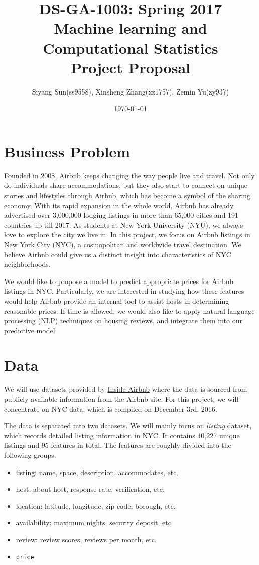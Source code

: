 \documentclass{article}
\begin{document}
	
	\pagestyle{fancy}
	\fancyhf{}
	
	\title{DS-GA-1003: Spring 2017 \\ 
		Machine learning and Computational Statistics \\ 
		Project Proposal}
	\date{\today}
	\author{Siyang Sun(ss9558), Xinsheng Zhang(xz1757), Zemin Yu(zy937)}
	\maketitle
	\section{Business Problem}
	Founded in 2008, Airbnb keeps changing the way people live and travel. Not only do individuals share accommodations, but they also start to connect on unique stories and lifestyles through Airbnb, which has become a symbol of the sharing economy. With its rapid expansion in the whole world, Airbnb has already advertised over 3,000,000 lodging listings in more than 65,000 cities and 191 countries up till 2017. As students at New York University (NYU), we always love to explore the city we live in. In this project, we focus on Airbnb listings in New York City (NYC), a cosmopolitan and worldwide travel destination. We believe Airbnb could give us a distinct insight into characteristics of NYC neighborhoods.
	
	We would like to propose a model to predict appropriate prices for Airbnb listings in NYC. Particularly, we are interested in studying how these features would help Airbnb provide an internal tool to assist hosts in determining reasonable prices. If time is allowed, we would also like to apply natural language processing (NLP) techniques on housing reviews, and integrate them into our predictive model.
	
	\section{Data}
	We will use datasets provided by \href{http://insideairbnb.com/get-the-data.html}{Inside Airbnb} where the data is sourced from publicly available information from the Airbnb site. For this project, we will concentrate on NYC data, which is compiled on December 3rd, 2016.
	
	The data is separated into two datasets. We will mainly focus on \textit{listing} dataset, which records detailed listing information in NYC. It contains 40,227 unique listings and 95 features in total. The features are roughly divided into the following groups.
	\begin{itemize}
		\item listing: name, space, description, accommodates, etc.
		\item host: about host, response rate, verification, etc.
		\item location: latitude, longitude, zip code, borough, etc.
		\item availability: maximum nights, security deposit, etc.
		\item review: review scores, reviews per month, etc.
		\item \texttt{price}
	\end{itemize}
	
\end{document}
